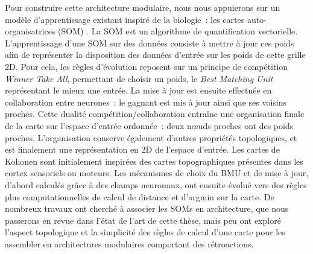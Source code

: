 Pour construire cette architecture modulaire, nous nous appuierons sur un modèle d'apprentissage existant inspiré de la biologie~: les cartes auto-organisatrices (SOM) \cite{Kohonen1982}.
La SOM est un algorithme de quantification vectorielle.
L'apprentissage d'une SOM sur des données consiste à mettre à jour ces poids afin de représenter la disposition des données d'entrée sur les poids de cette grille 2D.
Pour cela, les règles d'évolution reposent sur un principe de compétition \emph{Winner Take All}, permettant de choisir un poids, le \emph{Best Matching Unit} représentant le mieux une entrée. La mise à jour est ensuite effectuée en collaboration entre neurones~: le gagnant est mis à jour ainsi que ses voisins proches. Cette dualité compétition/collaboration entraîne une organisation finale de la carte sur l'espace d'entrée ordonnée~: deux n\oe{}uds proches ont des poids proches. L'organisation conserve également d'autres propriétés topologiques, et est finalement une représentation en 2D de l'espace d'entrée.
Les cartes de Kohonen sont initialement inspirées des cartes topographiques présentes dans les cortex sensoriels ou moteurs. Les mécanismes de choix du BMU et de mise à jour, d'abord calculés grâce à des champs neuronaux, ont ensuite évolué vers des règles plus computationnelles de calcul de distance et d'argmin sur la carte.
De nombreux travaux ont cherché à associer les SOMs en architecture, que nous passerons en revue dans l'état de l'art de cette thèse, mais peu ont exploré l'aspect topologique et la simplicité des règles de calcul d'une carte pour les assembler en architectures modulaires comportant des rétroactions.


